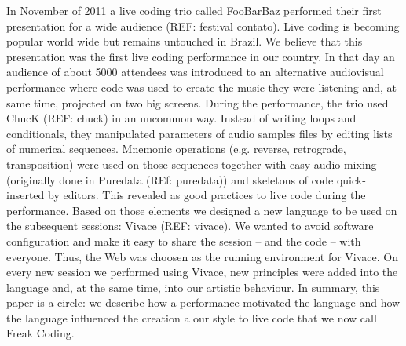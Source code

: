 \documentclass[letterpaper, 12pt]{article}
\begin{document}
In November of 2011 a live coding trio called FooBarBaz performed their first presentation for a wide audience (REF: festival contato). Live coding is becoming popular world wide but remains untouched in Brazil. We believe that this presentation was the first live coding performance in our country. In that day an audience of about 5000 attendees was introduced to an alternative audiovisual performance where code was used to create the music they were listening and, at same time, projected on two big screens.
During the performance, the trio used ChucK (REF: chuck) in an uncommon way. Instead of writing loops and conditionals, they manipulated parameters of audio samples files by editing lists of numerical sequences. Mnemonic operations (e.g. reverse, retrograde, transposition) were used on those sequences together with easy audio mixing (originally done in Puredata (REf: puredata)) and skeletons of code quick-inserted by editors. This revealed as good practices to live code during the performance.
Based on those elements we designed a new language to be used on the subsequent sessions: Vivace (REF: vivace). We wanted to avoid software configuration and make it easy to share the session -- and the code -- with everyone. Thus, the Web was choosen as the running environment for Vivace. On every new session we performed using Vivace, new principles were added into the language and, at the same time, into our artistic behaviour.
In summary, this paper is a circle: we describe how a performance motivated the language and how the language influenced the creation a our style to live code that we now call Freak Coding.
%
\parskip 18pt
\end{document}
